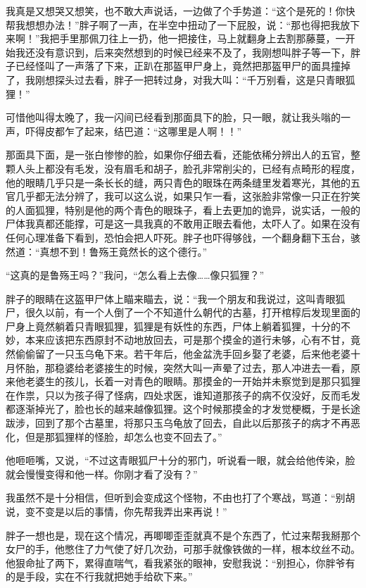 我真是又想哭又想笑，也不敢大声说话，一边做了个手势道：“这个是死的！你快帮我想想办法！”胖子啊了一声，在半空中扭动了一下屁股，说：“那也得把我放下来啊！”我把手里那佩刀往上一扔，他一把接住，马上就翻身上去割那藤蔓，一开始我还没有意识到，后来突然想到的时候已经来不及了，我刚想叫胖子等一下，胖子已经怪叫了一声落了下来，正趴在那盔甲尸身上，竟然把那盔甲尸的面具撞掉了，我刚想探头过去看，胖子一把转过身，对我大叫：“千万别看，这是只青眼狐狸！”

可惜他叫得太晚了，我一闪间已经看到那面具下的脸，只一眼，就让我头嗡的一声，吓得皮都乍了起来，结巴道：“这哪里是人啊！！”

那面具下面，是一张白惨惨的脸，如果你仔细去看，还能依稀分辨出人的五官，整颗人头上都没有毛发，没有眉毛和胡子，脸孔非常削尖的，已经有点畸形的程度，他的眼睛几乎只是一条长长的缝，两只青色的眼珠在两条缝里发着寒光，其他的五官几乎都无法分辨了，我可以这么说，如果只乍一看，这张脸非常像一只正在狞笑的人面狐狸，特别是他的两个青色的眼珠子，看上去更加的诡异，说实话，一般的尸体我真都还能撑，可是这一具我真的不敢用正眼去看他，太吓人了。如果在没有任何心理准备下看到，恐怕会把人吓死。胖子也吓得够戗，一个翻身翻下玉台，骇然道：“真想不到！鲁殇王竟然长的这个德行。”

“这真的是鲁殇王吗？”我问，“怎么看上去像……像只狐狸？”

胖子的眼睛在这盔甲尸体上瞄来瞄去，说：“我一个朋友和我说过，这叫青眼狐尸，很久以前，有一个人倒了一个不知道什么朝代的古墓，打开棺椁后发现里面的尸身上竟然躺着只青眼狐狸，狐狸是有妖性的东西，尸体上躺着狐狸，十分的不妙，本来应该把东西原封不动地放回去，可是那个摸金的道行未够，心有不甘，竟然偷偷留了一只玉乌龟下来。若干年后，他金盆洗手回乡娶了老婆，后来他老婆十月怀胎，那稳婆给老婆接生的时候，突然大叫一声晕了过去，那人冲进去一看，原来他老婆生的孩儿，长着一对青色的眼睛。那摸金的一开始并未察觉到是那只狐狸在作祟，只以为孩子得了怪病，四处求医，谁知道那孩子的病不仅没好，反而毛发都逐渐掉光了，脸也长的越来越像狐狸。这个时候那摸金的才发觉梗概，于是长途跋涉，回到了那个古墓里，将那只玉乌龟放了回去，自此以后那孩子的病才不再恶化，但是那狐狸样的怪脸，却怎么也变不回去了。”

他咂咂嘴，又说，“不过这青眼狐尸十分的邪门，听说看一眼，就会给他传染，脸就会慢慢变得和他一样。你刚才看了没有？”

我虽然不是十分相信，但听到会变成这个怪物，不由也打了个寒战，骂道：“别胡说，变不变是以后的事情，你先帮我弄出来再说！”

胖子一想也是，现在这个情况，再唧唧歪歪就真不是个东西了，忙过来帮我掰那个女尸的手，他憋住了力气使了好几次劲，可那手就像铁做的一样，根本纹丝不动。他狠命扯了两下，累得直喘气，看我紧张的眼神，安慰我说：“别担心，你胖爷有的是手段，实在不行我就把她手给砍下来。”

